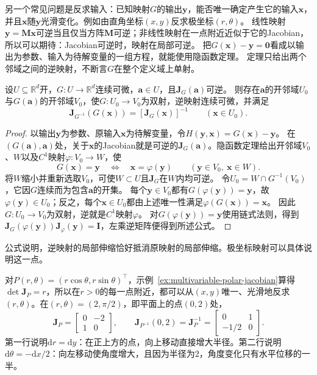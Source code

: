 另一个常见问题是反求输入：已知映射$G$的输出$\bm y$，能否唯一确定产生它的输入$\bm x$，并且$\bm x$随$\bm y$光滑变化。例如由直角坐标$(x,y)$反求极坐标$(r,\theta)$。
线性映射$\bm y=\bm M\bm x$可逆当且仅当方阵$\bm M$可逆；非线性映射在一点附近近似于它的Jacobian，所以可以期待：Jacobian可逆时，映射在局部可逆。
把$G(\bm x)-\bm y=\bm 0$看成以输出为参数、输入为待解变量的一组方程，就能使用隐函数定理。
定理只给出两个邻域之间的逆映射，不断言$G$在整个定义域上单射。
\begin{theorem}[局部反函数定理]
\label{thm:multivariable-inverse-function}
设$U\subseteq\mathbb R^d$开，$G:U\to\mathbb R^d$连续可微，$\bm a\in U$，且$\bm J_G(\bm a)$可逆。
则存在$\bm a$的开邻域$U_0$与$G(\bm a)$的开邻域$V_0$，使$G:U_0\to V_0$为双射，逆映射连续可微，并满足
\[
 \bm J_{G^{-1}}(G(\bm x))=[\bm J_G(\bm x)]^{-1}
 \qquad(\bm x\in U_0).
\]
\end{theorem}
\begin{proof}
以输出$\bm y$为参数、原输入$\bm x$为待解变量，令$H(\bm y,\bm x)=G(\bm x)-\bm y$。
在$(G(\bm a),\bm a)$处，关于$\bm x$的Jacobian就是可逆的$\bm J_G(\bm a)$。隐函数定理给出开邻域$V_0$、$W$以及$C^1$映射$\varphi:V_0\to W$，使
\[
 G(\bm x)=\bm y\quad\Longleftrightarrow\quad\bm x=\varphi(\bm y)
 \qquad(\bm y\in V_0,\ \bm x\in W).
\]
将$W$缩小并重新选取$V_0$，可使$W\subset U$且$\bm J_G$在$W$内均可逆。
令$U_0=W\cap G^{-1}(V_0)$，它因$G$连续而为包含$\bm a$的开集。
每个$\bm y\in V_0$都有$G(\varphi(\bm y))=\bm y$，故$\varphi(\bm y)\in U_0$；反之，每个$\bm x\in U_0$都由上述唯一性满足$\varphi(G(\bm x))=\bm x$。
因此$G:U_0\to V_0$为双射，逆就是$C^1$映射$\varphi$。
对$G(\varphi(\bm y))=\bm y$使用链式法则，得到$\bm J_G(\varphi(\bm y))\bm J_\varphi(\bm y)=\bm I$，左乘逆矩阵便得到所述公式。
\end{proof}
公式说明，逆映射的局部伸缩恰好抵消原映射的局部伸缩。极坐标映射可以具体说明这一点。
\begin{example}[极坐标的局部反函数]
\label{ex:multivariable-polar-local-inverse}
对$P(r,\theta)=(r\cos\theta,r\sin\theta)^\top$，示例~\ref{ex:multivariable-polar-jacobian}算得$\det\bm J_P=r$，所以在$r>0$的每一点附近，都可以从$(x,y)$唯一、光滑地反求$(r,\theta)$。在$(r,\theta)=(2,\pi/2)$，即平面上的点$(0,2)$处，
\[
 \bm J_P=\begin{bmatrix}0&-2\\1&0\end{bmatrix},
 \qquad
 \bm J_{P^{-1}}(0,2)=\bm J_P^{-1}=\begin{bmatrix}0&1\\-1/2&0\end{bmatrix}.
\]
第一行说明$\mathrm dr=\mathrm dy$：在正上方的点，向上移动直接增大半径。第二行说明$\mathrm d\theta=-\mathrm dx/2$：向左移动使角度增大，且因为半径为$2$，角度变化只有水平位移的一半。
\end{example}


